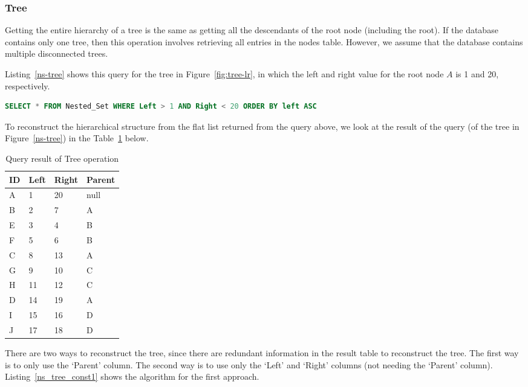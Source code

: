 \subsubsection{Tree}

Getting the entire hierarchy of a tree is the same as getting all the descendants of the root node (including the root). If the database contains only one tree, then this operation involves retrieving all entries in the nodes table. However, we assume that the database contains multiple disconnected trees.

Listing~\ref{ns-tree} shows this query for the tree in Figure~\ref{fig:tree-lr}, in which the left and right value for the root node $A$ is 1 and 20, respectively.

\begin{lstlisting}[language=sql, caption={Query for Tree for tree $A$ via nested set model},label=ns-tree]
SELECT * FROM Nested_Set WHERE Left > 1 AND Right < 20 ORDER BY left ASC
\end{lstlisting}

To reconstruct the hierarchical structure from the flat list returned from the query above, we look at the result of the query (of the tree in Figure~\ref{ns-tree}) in the Table~\ref{table:ns_tree} below.

\begin{table}[h]
\centering
\begin{tabular}{|l|l|l|l|}
\hline
{\bf ID} & {\bf Left} & {\bf Right} & {\bf Parent} \\ \hline\hline
A & 1 & 20 & null \\ \hline
B & 2 & 7 & A \\ \hline
E & 3 & 4 & B \\ \hline
F & 5 & 6 & B \\ \hline
C & 8 & 13 & A \\ \hline
G & 9 & 10 & C \\ \hline
H & 11 & 12	& C \\ \hline
D & 14 & 19	& A \\ \hline
I & 15 & 16	& D \\ \hline
J & 17 & 18	& D \\ \hline
\end{tabular}
\caption{Query result of Tree operation\label{table:ns_tree}}
\end{table}

There are two ways to reconstruct the tree, since there are redundant information in the result table to reconstruct the tree. The first way is to only use the `Parent' column. The second way is to use only the `Left' and `Right' columns (not needing the `Parent' column). Listing~\ref{ns_tree_const1} shows the algorithm for the first approach.

